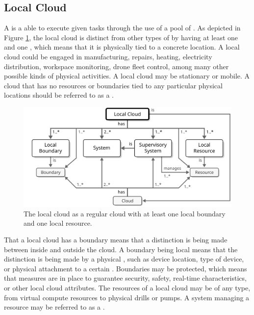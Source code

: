 \subsection{Local Cloud}
\label{sec:concepts:local-cloud}

A  is a  able to execute given tasks through the use of a pool of .
As depicted in Figure \ref{fig:local-cloud}, the local cloud is distinct from other types of  by having at least one  and one , which means that it is physically tied to a concrete location.
A local cloud could be engaged in manufacturing, repairs, heating, electricity distribution, workspace monitoring, drone fleet control, among many other possible kinds of physical activities.
A local cloud may be stationary or mobile.
A cloud that has no resources or boundaries tied to any particular physical locations should be referred to as a .

\begin{figure}[ht!]
  \centering
  \includegraphics[scale=0.9]{figures/local-cloud}
  \caption{
    The local cloud as a regular cloud with at least one local boundary and one local resource.
  }
  \label{fig:local-cloud}
\end{figure}

That a local cloud has a boundary means that a distinction is being made between  inside and outside the cloud.
A boundary being local means that the distinction is being made by a physical , such as device location, type of device, or physical attachment to a certain .
Boundaries may be protected, which means that measures are in place to guarantee security, safety, real-time characteristics, or other local cloud attributes.
The resources of a local cloud may be of any type, from virtual compute resources to physical drills or pumps.
A system managing a resource may be referred to as a .

